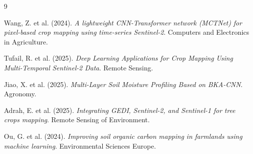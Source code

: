 \begin{thebibliography}{9}

Wang, Z. et al. (2024). \textit{A lightweight CNN-Transformer network (MCTNet)
for pixel-based crop mapping using time-series Sentinel-2}.
Computers and Electronics in Agriculture.

Tufail, R. et al. (2025). \textit{Deep Learning Applications for Crop Mapping
Using Multi-Temporal Sentinel-2 Data}. Remote Sensing.

Jiao, X. et al. (2025). \textit{Multi-Layer Soil Moisture Profiling Based on
BKA-CNN}. Agronomy.

Adrah, E. et al. (2025). \textit{Integrating GEDI, Sentinel-2, and Sentinel-1
for tree crops mapping}. Remote Sensing of Environment.

Ou, G. et al. (2024). \textit{Improving soil organic carbon mapping in farmlands
using machine learning}. Environmental Sciences Europe.

\end{thebibliography}
